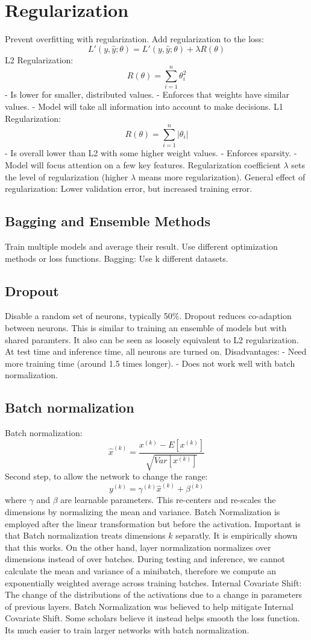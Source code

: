\documentclass{scrartcl}
\begin{document}
\section*{Regularization}
Prevent overfitting with regularization.
Add regularization to the loss:
$$L'(y, \hat{y}; \theta) = L'(y, \hat{y}; \theta) + \lambda R(\theta)$$
L2 Regularization:
$$R(\theta) = \sum_{i=1}^{n} \theta^2_i$$
- Is lower for smaller, distributed values.
- Enforces that weights have similar values.
- Model will take all information into account to make decisions.
L1 Regularization:
$$R(\theta) = \sum_{i=1}^{n} |\theta_i|$$
- Is overall lower than L2 with some higher weight values.
- Enforces sparsity.
- Model will focus attention on a few key features.
Regularization coefficient $\lambda$ sets the level of regularization (higher $\lambda$ means more regularization).
General effect of regularization: Lower validation error, but increased training error.

\subsection*{Bagging and Ensemble Methods}
Train multiple models and average their result. Use different optimization methods or loss functions. Bagging: Use k different datasets.

\subsection*{Dropout}
Disable a random set of neurons, typically 50\%. Dropout reduces co-adaption between neurons. This is similar to training an ensemble of models but with shared paramters. It also can be seen as loosely equivalent to L2 regularization.
At test time and inference time, all neurons are turned on.
Disadvantages:
- Need more training time (around 1.5 times longer).
- Does not work well with batch normalization.

\subsection*{Batch normalization}
Batch normalization:
$$\hat{x}^{(k)} = \frac{x^{(k)} - E[x^{(k)}]}{\sqrt{Var[x^{(k)}]}}$$
Second step, to allow the network to change the range:
$$y^{(k)} = \gamma^{(k)} \hat{x}^{(k)} + \beta^{(k)}$$
where $\gamma$ and $\beta$ are learnable parameters.
This re-centers and re-scales the dimensions by normalizing the mean and variance. Batch Normalization is employed after the linear transformation but before the activation. Important is that Batch normalization treats dimensions $k$ separatly. It is empirically shown that this works. On the other hand, layer normalization normalizes over dimensions instead of over batches. During testing and inference, we cannot calculate the mean and variance of a minibatch, therefore we compute an exponentially weighted average across training batches.
Internal Covariate Shift: The change of the distributions of the activations due to a change in parameters of previous layers. Batch Normalization was believed to help mitigate Internal Covariate Shift. Some scholars believe it instead helps smooth the loss function. Its much easier to train larger networks with batch normalization.
\end{document}
